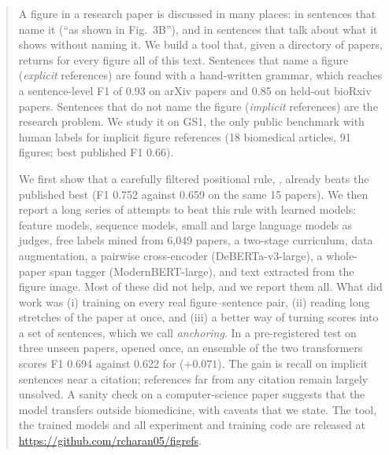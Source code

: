 \begin{abstract}
\noindent
A figure in a research paper is discussed in many places: in sentences that name it (``as shown in Fig.~3B''), and in
sentences that talk about what it shows without naming it. We build a tool that, given a directory of papers,
returns for every figure all of this text. Sentences that name a figure (\emph{explicit} references) are found
with a hand-written grammar, which reaches a sentence-level F1 of 0.93 on arXiv papers and 0.85 on held-out
bioRxiv papers. Sentences that do not name the figure (\emph{implicit} references) are the research problem.
We study it on \figsum{} GS1, the only public benchmark with human labels for implicit figure references
(18 biomedical articles, 91 figures; best published F1 0.66).

We first show that a carefully filtered positional rule, \bof{}, already beats the published best
(F1 0.752 against 0.659 on the same 15 papers). We then report a long series of attempts to beat this rule with
learned models: feature models, sequence models, small and large language models as judges, free labels mined
from 6{,}049 papers, a two-stage curriculum, data augmentation, a pairwise cross-encoder (DeBERTa-v3-large), a
whole-paper span tagger (ModernBERT-large), and text extracted from the figure image. Most of these did not
help, and we report them all. What did work was (i) training on every real figure--sentence pair,
(ii) reading long stretches of the paper at once, and (iii) a better way of turning scores into a set of
sentences, which we call \emph{anchoring}. In a pre-registered test on three unseen papers, opened once, an
ensemble of the two transformers scores F1 0.694 against 0.622 for \bof{} ($+0.071$). The gain is recall on implicit sentences near a citation; references far from any citation
remain largely unsolved. A sanity check on a computer-science paper suggests that the model transfers outside
biomedicine, with caveats that we state. The tool, the trained models and all experiment and training code are released at
\url{https://github.com/rcharan05/figrefs}.
\end{abstract}
